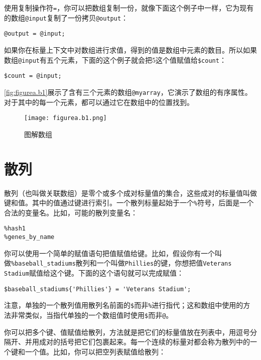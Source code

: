 使用复制操作符\verb|=|，你可以把数组复制一份，就像下面这个例子中一样，它为现有的数组\verb|@input|复制了一份拷贝\verb|@output|：

\begin{lstlisting}
@output = @input;
\end{lstlisting}

如果你在标量上下文中对数组进行求值，得到的值是数组中元素的数目。所以如果数组\verb|@input|有五个元素，下面的这个例子就会把5这个值赋值给\verb|$count|：

\begin{lstlisting}
$count = @input;
\end{lstlisting}

\autoref{fig:figurea.b1}展示了含有三个元素的数组\verb|@myarray|，它演示了数组的有序属性。对于其中的每一个元素，都可以通过它在数组中的位置找到。

\begin{figure}
  \centering
  \texttt{[image: figurea.b1.png]}
  \caption{图解数组}
  \label{fig:figurea.b1}
 \end{figure}{}

\section{散列}
散列（也叫做关联数组）是零个或多个成对标量值的集合，这些成对的标量值叫做键和值。其中的值通过键进行索引。一个散列标量起始于一个\verb|%|符号，后面是一个合法的变量名。比如，可能的散列变量名：

\begin{lstlisting}
%hash1
%genes_by_name
\end{lstlisting}

你可以使用一个简单的赋值语句把值赋值给键。比如，假设你有一个叫做\verb|%baseball_stadiums|散列和一个叫做\verb|Phillies|的键，你想把值\verb|Veterans Stadium|赋值给这个键。下面的这个语句就可以完成赋值：

\begin{lstlisting}
$baseball_stadiums{'Phillies'} = 'Veterans Stadium';
\end{lstlisting}

注意，单独的一个散列值用散列名前面的\verb|$|而非\verb|%|进行指代；这和数组中使用的方法非常类似，当指代单独的一个数组值时使用\verb|$|而非\verb|@|。

你可以把多个键、值赋值给散列，方法就是把它们的标量值放在列表中，用逗号分隔开、并用成对的括号把它们包裹起来。每一个连续的标量对都会称为散列中的一个键和一个值。比如，你可以把空列表赋值给散列：

